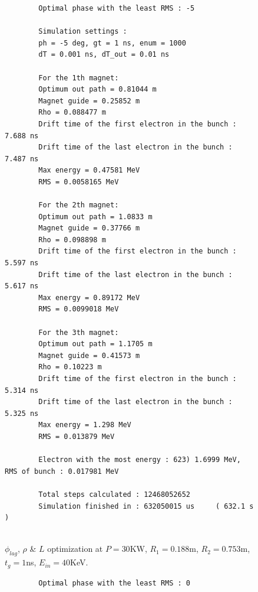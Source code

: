 \documentclass[a4paper,oneside,12pt]{report}
\numberwithin{equation}{chapter}
\begin{document}
{\begin{figure}[H]
    \centering
    \begin{verbatim}
        Optimal phase with the least RMS : -5

        Simulation settings : 
        ph = -5 deg, gt = 1 ns, enum = 1000
        dT = 0.001 ns, dT_out = 0.01 ns
        
        For the 1th magnet:
        Optimum out path = 0.81044 m
        Magnet guide = 0.25852 m
        Rho = 0.088477 m
        Drift time of the first electron in the bunch : 7.688 ns
        Drift time of the last electron in the bunch : 7.487 ns
        Max energy = 0.47581 MeV
        RMS = 0.0058165 MeV
        
        For the 2th magnet:
        Optimum out path = 1.0833 m
        Magnet guide = 0.37766 m
        Rho = 0.098898 m
        Drift time of the first electron in the bunch : 5.597 ns
        Drift time of the last electron in the bunch : 5.617 ns
        Max energy = 0.89172 MeV
        RMS = 0.0099018 MeV
        
        For the 3th magnet:
        Optimum out path = 1.1705 m
        Magnet guide = 0.41573 m
        Rho = 0.10223 m
        Drift time of the first electron in the bunch : 5.314 ns
        Drift time of the last electron in the bunch : 5.325 ns
        Max energy = 1.298 MeV
        RMS = 0.013879 MeV

        Electron with the most energy : 623) 1.6999 MeV,	RMS of bunch : 0.017981 MeV
        
        Total steps calculated : 12468052652
        Simulation finished in : 632050015 us     ( 632.1 s )
        
    \end{verbatim}
    \vspace{20pt}
\caption{$\phi_{lag}$, $\rho$ \& $L$ optimization at $P=30$KW, $R_1=0.188$m, $R_2=0.753$m, $t_g=1$ns, $E_{in}=40$KeV.}
\label{fig:lout_opt_1ns_Erms}
\end{figure}

\begin{figure}[H]
    \centering
    \begin{verbatim}
        Optimal phase with the least RMS : 0


\end{verbatim}
\end{figure}}
\end{document}

